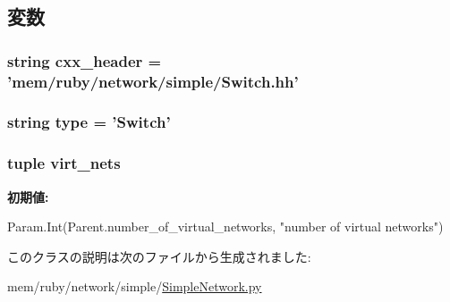 \subsection{変数}
\hypertarget{classSimpleNetwork_1_1Switch_a17da7064bc5c518791f0c891eff05fda}{
\subsubsection[{cxx\_\-header}]{\setlength{\rightskip}{0pt plus 5cm}string {\bf cxx\_\-header} = 'mem/ruby/network/simple/Switch.hh'}}
\label{classSimpleNetwork_1_1Switch_a17da7064bc5c518791f0c891eff05fda}
\hypertarget{classSimpleNetwork_1_1Switch_acce15679d830831b0bbe8ebc2a60b2ca}{
\subsubsection[{type}]{\setlength{\rightskip}{0pt plus 5cm}string {\bf type} = '{\bf Switch}'}}
\label{classSimpleNetwork_1_1Switch_acce15679d830831b0bbe8ebc2a60b2ca}
\hypertarget{classSimpleNetwork_1_1Switch_a84c7a415611bc1b55aa5e7fd9e9601e8}{
\subsubsection[{virt\_\-nets}]{\setlength{\rightskip}{0pt plus 5cm}tuple {\bf virt\_\-nets}}}
\label{classSimpleNetwork_1_1Switch_a84c7a415611bc1b55aa5e7fd9e9601e8}
{\bfseries 初期値:}
\begin{DoxyCode}
Param.Int(Parent.number_of_virtual_networks,
                          "number of virtual networks")
\end{DoxyCode}


このクラスの説明は次のファイルから生成されました:\begin{DoxyCompactItemize}
\item 
mem/ruby/network/simple/\hyperlink{SimpleNetwork_8py}{SimpleNetwork.py}\end{DoxyCompactItemize}
